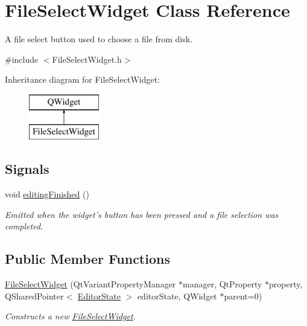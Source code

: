 \hypertarget{class_file_select_widget}{\section{File\-Select\-Widget Class Reference}
\label{class_file_select_widget}
}


A file select button used to choose a file from disk.  




{\ttfamily \#include $<$File\-Select\-Widget.\-h$>$}

Inheritance diagram for File\-Select\-Widget\-:\begin{figure}[H]
\begin{center}
\leavevmode
\includegraphics[height=2.000000cm]{class_file_select_widget}
\end{center}
\end{figure}
\subsection*{Signals}
\begin{DoxyCompactItemize}
\item 
\hypertarget{class_file_select_widget_a378dd472674e30b1792540437e2a8ccb}{void \hyperlink{class_file_select_widget_a378dd472674e30b1792540437e2a8ccb}{editing\-Finished} ()}\label{class_file_select_widget_a378dd472674e30b1792540437e2a8ccb}

\begin{DoxyCompactList}\small\item\em Emitted when the widget's button has been pressed and a file selection was completed. \end{DoxyCompactList}\end{DoxyCompactItemize}
\subsection*{Public Member Functions}
\begin{DoxyCompactItemize}
\item 
\hyperlink{class_file_select_widget_ae0266e866f2292e9a7c08554b85e2973}{File\-Select\-Widget} (Qt\-Variant\-Property\-Manager $\ast$manager, Qt\-Property $\ast$property, Q\-Shared\-Pointer$<$ \hyperlink{class_editor_state}{Editor\-State} $>$ editor\-State, Q\-Widget $\ast$parent=0)
\begin{DoxyCompactList}\small\item\em Constructs a new \hyperlink{class_file_select_widget}{File\-Select\-Widget}. \end{DoxyCompactList}\end{DoxyCompactItemize}


